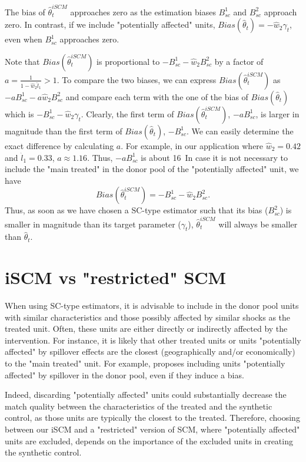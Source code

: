 The bias of $\widehat{\theta}_{t}^{iSCM}$ approaches zero as the estimation biases $B_{sc}^1$ and $B_{sc}^2$ approach zero. In contrast, if we include "potentially affected" units, $Bias\left(\widehat{\theta}_{t}\right) =- \widehat{w}_{2}\gamma_t$, even when $B_{sc}^1$ approaches zero.

Note that $Bias\left(\widehat{\theta}^{iSCM}_{t}\right)$ is proportional to $-B_{sc}^1 - \widehat{w}_{2}B_{sc}^2$ by a factor of $a = \frac{1}{1 - \widehat{w}_{2}\widehat{l}_{1}} > 1$. To compare the two biases, we can express $Bias\left(\widehat{\theta}^{iSCM}_{t}\right)$ as $-aB_{sc}^1 - a\widehat{w}_{2}B_{sc}^2$ and compare each term with the one of the bias of $Bias\left(\widehat{\theta}_{t}\right)$ which is  $-B_{sc}^1 - \widehat{w}_{2}\gamma_t$. Clearly, the first term of $Bias\left(\widehat{\theta}^{iSCM}_{t}\right)$, $-aB_{sc}^1$, is larger in magnitude than the first term of $Bias\left(\widehat{\theta}_{t}\right)$, $-B_{sc}^1$. We can easily determine the exact difference by calculating $a$. For example, in our application where $\widehat{w}_{2} = 0.42$ and $\widehat{l}_{1} = 0.33$, $a \approx 1.16$. Thus, $-aB_{sc}^1$ is about 16\
In case it is not necessary to include the "main treated" in the donor pool of the "potentially affected" unit, we have
$$
Bias\left(\widehat{\theta}^{iSCM}_{t}\right)=-B_{sc}^1 - \widehat{w}_{2}B_{sc}^2.
$$
Thus, as soon as we have chosen a SC-type estimator such that its bias ($B_{sc}^2$) is smaller in magnitude than its target parameter ($\gamma_t$), $\widehat{\theta}^{iSCM}_{t}$ will always be smaller than $\widehat{\theta}_{t}$.


\section{iSCM vs "restricted" SCM}\label{implementation}
When using SC-type estimators, it is advisable to include in the donor pool units with similar characteristics and those possibly affected by similar shocks as the treated unit. Often, these units are either directly or indirectly affected by the intervention. For instance, it is likely that other treated units or units "potentially affected" by spillover effects are the closest (geographically and/or economically) to the "main treated" unit. For example, \cite{Aba2020} proposes including units "potentially affected" by spillover in the donor pool, even if they induce a bias.

Indeed, discarding "potentially affected" units could substantially decrease the match quality between the characteristics of the treated and the synthetic control, as those units are typically the closest to the treated. Therefore, choosing between our iSCM and a "restricted" version of SCM, where "potentially affected" units are excluded, depends on the importance of the excluded units in creating the synthetic control. 


